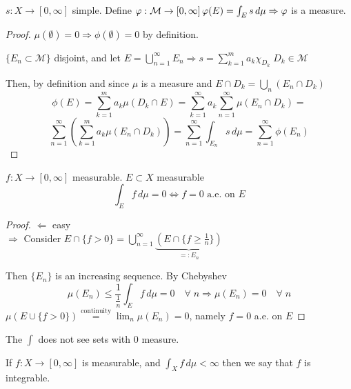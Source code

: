 \begin{theorem}
    \(s : X \to \left[0, \infty\right]\) simple. Define \(\phi : \mathcal{M} \to \left[0, \infty\right] \\ \phi(E) = \int_E s \, d\mu \\ \Rightarrow \phi \) is a measure. 
\end{theorem}

\begin{proof}
    \(\mu(\emptyset) =0 \Rightarrow \phi(\emptyset)=0 \) by definition. 
    \begin{definition}
        \(\{E_n \subset \mathcal{M}\}\) disjoint, and let \(E = \bigcup_{n=1}^\infty E_n \Rightarrow s = \sum_{k=1}^m a_k \chi_{D_k} \; D_k \in \mathcal{M}
        \)
    \end{definition}
    Then, by definition and since \(\mu\) is a measure and \(E \cap D_k = \bigcup_n (E_n \cap D_k)  \) 
    \[
        \phi(E) = \sum_{k=1}^m a_k \mu(D_k \cap E) = 
        \sum_{k=1}^\infty a_k \sum_{n=1}^\infty \mu(E_n \cap D_k)= 
    \]
    \[    
        \sum_{n=1}^\infty \left( \sum_{k=1}^m a_k \mu (E_n \cap D_k) \right) = 
        \sum_{n=1}^\infty \int_{E_n} s \, d\mu = 
        \sum_{n=1}^\infty \phi(E_n)
    \]
\end{proof}

\begin{theorem}
    \(f: X \to \left[0, \infty\right]\) measurable. \(E \subset X \) measurable 
    \[\int_E f \, d\mu =0 \Leftrightarrow f=0 \text{ a.e. on } E \]
\end{theorem}
\begin{proof}
    \( \Leftarrow \) easy \\
    \( \Rightarrow \) Consider \( E \cap \{f >0\} = \bigcup_{n=1}^\infty \underbrace{\left(E \cap \{ f \geq \frac{1}{n} \} \right)}_{=:E_n} \) 
    
    Then \(\{E_n\}\) is an increasing sequence. By Chebyshev 
    \[
        \mu (E_n) \leq \frac{1}{\frac{1}{n}} \int_E f \, d\mu =0 \quad \forall \; n \Rightarrow \mu(E_n)=0 \quad \forall \; n 
    \]
    \(\mu(E \cup \{f>0\}) \overset{\text{continuity}}{=} \lim_n \mu (E_n)=0\), namely \(f=0\) a.e. on \(E\)
\end{proof}

The \(\int\) does not see sets with 0 measure.

\begin{definition}
    If \( f:X \to \left[0, \infty\right] \) is measurable, and \( \int_X f \, d\mu < \infty \) then we say that \(f\) is integrable.
\end{definition}

